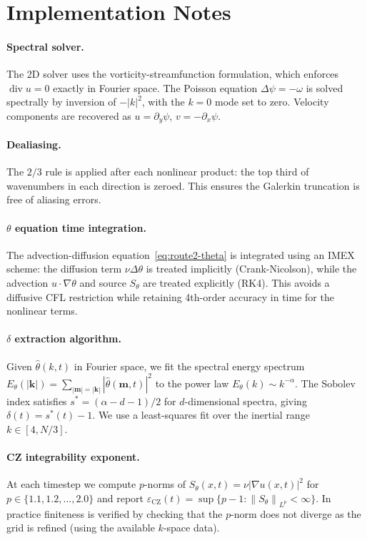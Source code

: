 \documentclass[11pt]{article}
\theoremstyle{definition}
\newcommand{\norm}[1]{\left\|#1\right\|}
\newcommand{\abs}[1]{\left|#1\right|}
\newcommand{\grad}{\nabla}
\newcommand{\divg}{\operatorname{div}}
\newcommand{\eps}{\varepsilon}
\newcommand{\CZ}{\mathrm{CZ}}
\newcommand{\thetafield}{\theta}
\begin{document}
\appendix

\section{Implementation Notes}
\label{app:implementation}

\paragraph{Spectral solver.}
The 2D solver uses the vorticity-streamfunction formulation, which enforces
$\divg u = 0$ exactly in Fourier space. The Poisson equation $\Delta \psi = -\omega$
is solved spectrally by inversion of $-\abs{k}^2$, with the $k = 0$ mode set to zero.
Velocity components are recovered as $u = \partial_y \psi$, $v = -\partial_x \psi$.

\paragraph{Dealiasing.}
The $2/3$ rule is applied after each nonlinear product: the top third of wavenumbers
in each direction is zeroed. This ensures the Galerkin truncation is free of
aliasing errors.

\paragraph{$\theta$ equation time integration.}
The advection-diffusion equation~\eqref{eq:route2-theta} is integrated using
an IMEX scheme: the diffusion term $\nu \Delta \thetafield$ is treated implicitly
(Crank-Nicolson), while the advection $u \cdot \grad \thetafield$ and source $S_\theta$
are treated explicitly (RK4). This avoids a diffusive CFL restriction while
retaining 4th-order accuracy in time for the nonlinear terms.

\paragraph{$\delta$ extraction algorithm.}
Given $\hat\theta(k, t)$ in Fourier space, we fit the spectral energy spectrum
$E_\theta(|\mathbf{k}|) = \sum_{|\mathbf{m}| = |\mathbf{k}|} |\hat\theta(\mathbf{m}, t)|^2$
to the power law $E_\theta(k) \sim k^{-\alpha}$. The Sobolev index satisfies
$s^* = (\alpha - d - 1)/2$ for $d$-dimensional spectra, giving $\delta(t) = s^*(t) - 1$.
We use a least-squares fit over the inertial range $k \in [4, N/3]$.

\paragraph{CZ integrability exponent.}
At each timestep we compute $p$-norms of $S_\theta(x,t) = \nu \abs{\grad u(x,t)}^2$
for $p \in \{1.1, 1.2, \ldots, 2.0\}$ and report $\eps_{\CZ}(t) = \sup\{p - 1 : \norm{S_\theta}_{L^p} < \infty\}$.
In practice finiteness is verified by checking that the $p$-norm does not diverge
as the grid is refined (using the available $k$-space data).
\end{document}
